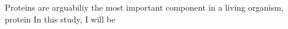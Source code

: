 Proteins are arguabiliy the most important component in a living organism, protein   In this study, I will be 